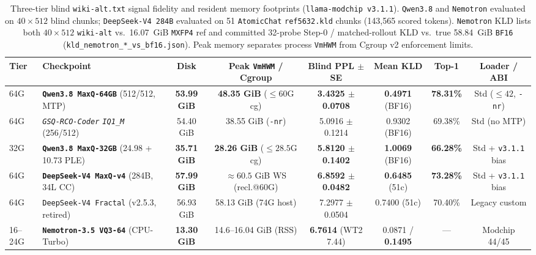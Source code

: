 \documentclass[10pt,twocolumn]{article}
\begin{document}
\begin{table}[t]
\centering
\caption{Three-tier blind \texttt{wiki-alt.txt} signal fidelity and resident memory footprints (\texttt{llama-modchip v3.1.1}). \texttt{Qwen3.8} and \texttt{Nemotron} evaluated on $40\times 512$ blind chunks; \texttt{DeepSeek-V4 284B} evaluated on 51 \texttt{AtomicChat} \texttt{ref5632.kld} chunks (143,565 scored tokens). \texttt{Nemotron} KLD lists both $40\times 512$ \texttt{wiki-alt} vs.\ 16.07~GiB \texttt{MXFP4} ref and committed 32-probe Step-0 / matched-rollout KLD vs.\ true 58.84~GiB \texttt{BF16} (\texttt{kld\_nemotron\_*\_vs\_bf16.json}). Peak memory separates process \texttt{VmHWM} from Cgroup v2 enforcement limits.}
\label{tab:quality}
\scriptsize
\setlength{\tabcolsep}{1.9pt}
\begin{tabularx}{\textwidth}{@{}l>{\raggedright\arraybackslash}p{3.45cm}cccccc@{}}
\toprule
\textbf{Tier} & \textbf{Checkpoint} & \textbf{Disk} & \textbf{Peak \texttt{VmHWM} / Cgroup} & \textbf{Blind PPL $\pm$ SE} & \textbf{Mean KLD} & \textbf{Top-1} & \textbf{Loader / ABI} \\
\midrule
64G & \textbf{\texttt{Qwen3.8 MaxQ-64GB}} (512/512, MTP) & \textbf{53.99 GiB} & \textbf{48.35 GiB} ($\le 60$G cg) & \textbf{3.4325 $\pm$ 0.0708} & \textbf{0.4971} (BF16) & \textbf{78.31\%} & Std ($\le 42$, \texttt{-nr}) \\
64G & \textit{\texttt{GSQ-RCO-Coder} \texttt{IQ1\_M}} (256/512) & 54.40 GiB & 38.55 GiB (\texttt{-nr}) & 5.0916 $\pm$ 0.1214 & 0.9302 (BF16) & 69.38\% & Std (no MTP) \\
32G & \textbf{\texttt{Qwen3.8 MaxQ-32GB}} (24.98 + 10.73 PLE) & \textbf{35.71 GiB} & \textbf{28.26 GiB} ($\le 28.5$G cg) & \textbf{5.8120 $\pm$ 0.1402} & \textbf{1.0069} (BF16) & \textbf{66.28\%} & Std + \texttt{v3.1.1} bias \\
\midrule
64G & \textbf{\texttt{DeepSeek-V4 MaxQ-v4}} (284B, 34L CC) & \textbf{57.99 GiB} & ${\approx}60.5$ GiB WS\rlap{$^\ddagger$} (recl.@60G) & \textbf{6.8592 $\pm$ 0.0482} & \textbf{0.6485} (51c) & \textbf{73.28\%} & Std + \texttt{v3.1.1} bias \\
64G & \texttt{DeepSeek-V4 Fractal} (v2.5.3, retired) & 56.93 GiB & 58.13 GiB (74G host) & 7.2977 $\pm$ 0.0504 & 0.7400 (51c) & 70.40\% & Legacy custom \\
\midrule
16--24G & \textbf{\texttt{Nemotron-3.5 VQ3-64}} (CPU-Turbo) & \textbf{13.30 GiB} & 14.6--16.04 GiB (RSS) & \textbf{6.7614} (WT2 7.44) & 0.0871 / \textbf{0.1495}\rlap{$^\dagger$} & --- & Modchip 44/45 \\

\end{tabularx}
\end{table}
\end{document}
